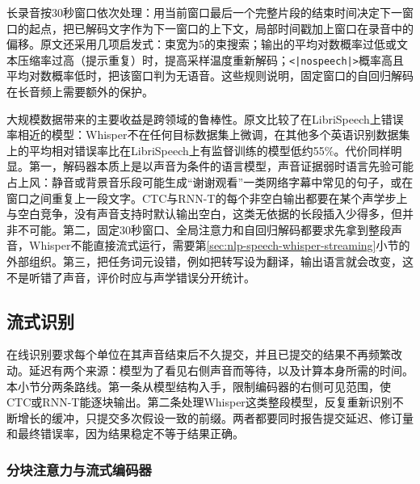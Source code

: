 长录音按30秒窗口依次处理：用当前窗口最后一个完整片段的结束时间决定下一窗口的起点，把已解码文字作为下一窗口的上下文，局部时间戳加上窗口在录音中的偏移。原文还采用几项启发式：束宽为5的束搜索；输出的平均对数概率过低或文本压缩率过高（提示重复）时，提高采样温度重新解码；\texttt{<|nospeech|>}概率高且平均对数概率低时，把该窗口判为无语音。这些规则说明，固定窗口的自回归解码在长音频上需要额外的保护。

大规模数据带来的主要收益是跨领域的鲁棒性。原文比较了在LibriSpeech上错误率相近的模型：Whisper不在任何目标数据集上微调，在其他多个英语识别数据集上的平均相对错误率比在LibriSpeech上有监督训练的模型低约55\%。代价同样明显。第一，解码器本质上是以声音为条件的语言模型，声音证据弱时语言先验可能占上风：静音或背景音乐段可能生成“谢谢观看”一类网络字幕中常见的句子，或在窗口之间重复上一段文字。CTC与RNN-T的每个非空白输出都要在某个声学步上与空白竞争，没有声音支持时默认输出空白，这类无依据的长段插入少得多，但并非不可能。第二，固定30秒窗口、全局注意力和自回归解码都要求先拿到整段声音，Whisper不能直接流式运行，需要第\ref{sec:nlp-speech-whisper-streaming}小节的外部组织。第三，把任务词元设错，例如把转写设为翻译，输出语言就会改变，这不是听错了声音，评价时应与声学错误分开统计。

\subsection{流式识别}
\label{sec:nlp-speech-streaming}

在线识别要求每个单位在其声音结束后不久提交，并且已提交的结果不再频繁改动。延迟有两个来源：模型为了看见右侧声音而等待，以及计算本身所需的时间。本小节分两条路线。第一条从模型结构入手，限制编码器的右侧可见范围，使CTC或RNN-T能逐块输出。第二条处理Whisper这类整段模型，反复重新识别不断增长的缓冲，只提交多次假设一致的前缀。两者都要同时报告提交延迟、修订量和最终错误率，因为结果稳定不等于结果正确。

\subsubsection{分块注意力与流式编码器}
\label{sec:nlp-speech-chunk-attention}


